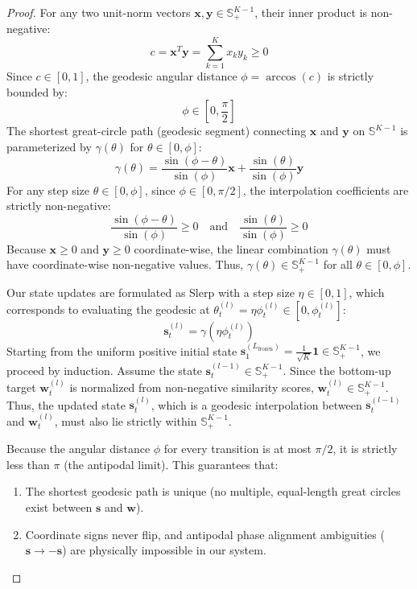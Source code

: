 \documentclass{article}
\theoremstyle{plain}
\theoremstyle{definition}
\theoremstyle{remark}
\begin{document}
\begin{proof}
For any two unit-norm vectors $\mathbf{x}, \mathbf{y} \in \mathbb{S}^{K-1}_+$, their inner product is non-negative:
\begin{equation}
c = \mathbf{x}^T \mathbf{y} = \sum_{k=1}^K x_k y_k \ge 0
\end{equation}
Since $c \in [0, 1]$, the geodesic angular distance $\phi = \arccos(c)$ is strictly bounded by:
\begin{equation}
\phi \in \left[0, \frac{\pi}{2}\right]
\end{equation}
The shortest great-circle path (geodesic segment) connecting $\mathbf{x}$ and $\mathbf{y}$ on $\mathbb{S}^{K-1}$ is parameterized by $\gamma(\theta)$ for $\theta \in [0, \phi]$:
\begin{equation}
\gamma(\theta) = \frac{\sin(\phi - \theta)}{\sin(\phi)} \mathbf{x} + \frac{\sin(\theta)}{\sin(\phi)} \mathbf{y}
\end{equation}
For any step size $\theta \in [0, \phi]$, since $\phi \in [0, \pi/2]$, the interpolation coefficients are strictly non-negative:
\begin{equation}
\frac{\sin(\phi - \theta)}{\sin(\phi)} \ge 0 \quad \text{and} \quad \frac{\sin(\theta)}{\sin(\phi)} \ge 0
\end{equation}
Because $\mathbf{x} \ge 0$ and $\mathbf{y} \ge 0$ coordinate-wise, the linear combination $\gamma(\theta)$ must have coordinate-wise non-negative values. Thus, $\gamma(\theta) \in \mathbb{S}^{K-1}_+$ for all $\theta \in [0, \phi]$.

Our state updates are formulated as Slerp with a step size $\eta \in [0, 1]$, which corresponds to evaluating the geodesic at $\theta_t^{(l)} = \eta \phi_t^{(l)} \in [0, \phi_t^{(l)}]$:
\begin{equation}
\mathbf{s}_t^{(l)} = \gamma\left(\eta \phi_t^{(l)}\right)
\end{equation}
Starting from the uniform positive initial state $\mathbf{s}_1^{(L_{\text{frozen}})} = \frac{1}{\sqrt{K}}\mathbf{1} \in \mathbb{S}^{K-1}_+$, we proceed by induction. Assume the state $\mathbf{s}_t^{(l-1)} \in \mathbb{S}^{K-1}_+$. Since the bottom-up target $\mathbf{w}_t^{(l)}$ is normalized from non-negative similarity scores, $\mathbf{w}_t^{(l)} \in \mathbb{S}^{K-1}_+$. Thus, the updated state $\mathbf{s}_t^{(l)}$, which is a geodesic interpolation between $\mathbf{s}_t^{(l-1)}$ and $\mathbf{w}_t^{(l)}$, must also lie strictly within $\mathbb{S}^{K-1}_+$.

Because the angular distance $\phi$ for every transition is at most $\pi/2$, it is strictly less than $\pi$ (the antipodal limit). This guarantees that:
\begin{enumerate}
    \item The shortest geodesic path is unique (no multiple, equal-length great circles exist between $\mathbf{s}$ and $\mathbf{w}$).
    \item Coordinate signs never flip, and antipodal phase alignment ambiguities ($\mathbf{s} \to -\mathbf{s}$) are physically impossible in our system.
\end{enumerate}
\end{proof}
\end{document}

